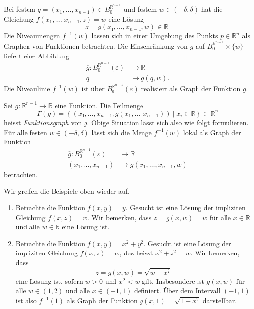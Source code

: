 \documentclass[../main.tex]{subfiles}
\begin{document}
\begin{geometric}
  Bei festem $q = (x_1, \dots, x_{n-1}) \in B_0^{\mathbb{R}^{n-1}}$ 
  und festem $w \in (-\delta, \delta)$ hat die Gleichung
  $f(x_1, \dots, x_{n-1}, z) = w$ eine Lösung
  \[
  z = g(x_1, \dots, x_{n-1}, w) \in \mathbb{R}.
  \]
  Die Niveaumengen $f^{-1}(w)$ lassen sich in einer
  Umgebung des Punkts $p \in \mathbb{R}^n$ 
  als Graphen von Funktionen betrachten.
  Die Einschränkung von $g$ auf $B_0^{\mathbb{R}^{n-1}} \times \{w\}$
  liefert eine Abbildung
  \begin{align*}
    \overline g \colon B_0^{\mathbb{R}^{n-1}}(\varepsilon) & \to \mathbb{R} \\
    q & \mapsto g(q, w).
  \end{align*}
  Die Niveaulinie $f^{-1}(w)$ ist über
  $B_0^{\mathbb{R}^{n-1}}(\varepsilon)$ realisiert als Graph der
  Funktion $\overline g$.
\end{geometric}

\begin{remark}
  Sei $g \colon \mathbb{R}^{n-1} \to \mathbb{R}$ eine Funktion.
  Die Teilmenge
  \[
    \Gamma(g) = \left\{(x_1, \dots, x_{n-1}, g(x_1, \dots, x_{n-1})) \mid 
    x_i \in \mathbb{R} \right\} \subset \mathbb{R}^n
  \]
  heisst \emph{Funktionsgraph} von $g$.
  Obige Situation lässt sich also wie folgt formulieren.
  Für alle festen $w \in (-\delta, \delta)$ lässt sich die
  Menge $f^{-1}(w)$ lokal als Graph der Funktion
  \begin{align*}
    \overline g \colon B_0^{\mathbb{R}^{n-1}}(\varepsilon) & \to \mathbb{R} \\
    (x_1, \dots, x_{n-1}) & \mapsto g(x_1, \dots, x_{n-1}, w)
  \end{align*}
  betrachten.
\end{remark}

\begin{examples}
  Wir greifen die Beispiele oben wieder auf.
  \begin{enumerate}[(1)]
    \item Betrachte die Funktion $f(x, y) = y$.
      Gesucht ist eine Lösung der impliziten Gleichung
      $f(x, z) = w$.
      Wir bemerken, dass $z = g(x, w) = w$
      für alle $x \in \mathbb{R}$ und alle $w \in \mathbb{R}$ 
      eine Lösung ist.
    \item Betrachte die Funktion $f(x, y) = x^2 + y^2$.
      Gesucht ist eine Lösung der impliziten Gleichung
      $f(x, z) = w$, das heisst $x^2 + z^2 = w$.
      Wir bemerken, dass \[z = g(x, w) = \sqrt{w - x^2}\] eine Lösung ist,
      sofern $w > 0$ und $x^2 < w$ gilt.
      Insbesondere ist $g(x, w)$ für alle $w \in (1, 2)$ 
      und alle $x \in (-1, 1)$ definiert.
      Über dem Intervall $(-1, 1)$ ist also
      $f^{-1}(1)$ als Graph der Funktion
      $g(x, 1) = \sqrt{1 - x^2}$ darstellbar.
  \end{enumerate}
\end{examples}
\end{document}
